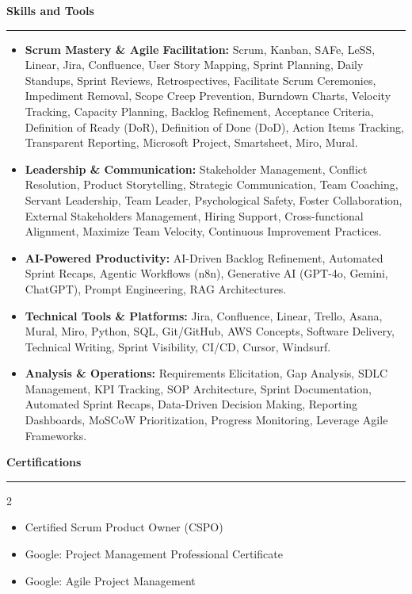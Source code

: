 \documentclass[9pt,letterpaper]{article} %
\newenvironment{rSection}[1]{ %
  \sectionskip
 \textbf{\Large #1} %
  \sectionlineskip
  \hrule %
  \begin{list}{}{ %
    \setlength{\leftmargin}{-0em} %
  }
  \item[]
}{
  \end{list}
}
\def\sectionlineskip{\smallskip} %
\def\sectionskip{} %
\begin{document}
\begin{rSection}{Skills and Tools}
\begin{itemize}[left=-1.5em, labelsep=.1cm, labelwidth=.2cm, itemsep=0.0em, topsep=0pt]
\item \textbf{Scrum Mastery \& Agile Facilitation:} Scrum, Kanban, SAFe, LeSS, Linear, Jira, Confluence, User Story Mapping, Sprint Planning, Daily Standups, Sprint Reviews, Retrospectives, Facilitate Scrum Ceremonies, Impediment Removal, Scope Creep Prevention, Burndown Charts, Velocity Tracking, Capacity Planning, Backlog Refinement, Acceptance Criteria, Definition of Ready (DoR), Definition of Done (DoD), Action Items Tracking, Transparent Reporting, Microsoft Project, Smartsheet, Miro, Mural.
\item \textbf{Leadership \& Communication:} Stakeholder Management, Conflict Resolution, Product Storytelling, Strategic Communication, Team Coaching, Servant Leadership, Team Leader, Psychological Safety, Foster Collaboration, External Stakeholders Management, Hiring Support, Cross-functional Alignment, Maximize Team Velocity, Continuous Improvement Practices.
\item \textbf{AI-Powered Productivity:} AI-Driven Backlog Refinement, Automated Sprint Recaps, Agentic Workflows (n8n), Generative AI (GPT-4o, Gemini, ChatGPT), Prompt Engineering, RAG Architectures.
\item \textbf{Technical Tools \& Platforms:} Jira, Confluence, Linear, Trello, Asana, Mural, Miro, Python, SQL, Git/GitHub, AWS Concepts, Software Delivery, Technical Writing, Sprint Visibility, CI/CD, Cursor, Windsurf.
\item \textbf{Analysis \& Operations:} Requirements Elicitation, Gap Analysis, SDLC Management, KPI Tracking, SOP Architecture, Sprint Documentation, Automated Sprint Recaps, Data-Driven Decision Making, Reporting Dashboards, MoSCoW Prioritization, Progress Monitoring, Leverage Agile Frameworks.
\end{itemize}
\end{rSection}%
\begin{rSection}{Certifications}
\begin{multicols}{2}
\begin{itemize}[left=-1.5em, labelsep=.1cm, labelwidth=.2cm, itemsep=0.0em, topsep=0pt]
\item Certified Scrum Product Owner (CSPO)
\item Google: Project Management Professional Certificate
\item Google: Agile Project Management
\end{itemize}
\end{multicols}
\end{rSection}
\end{document}
